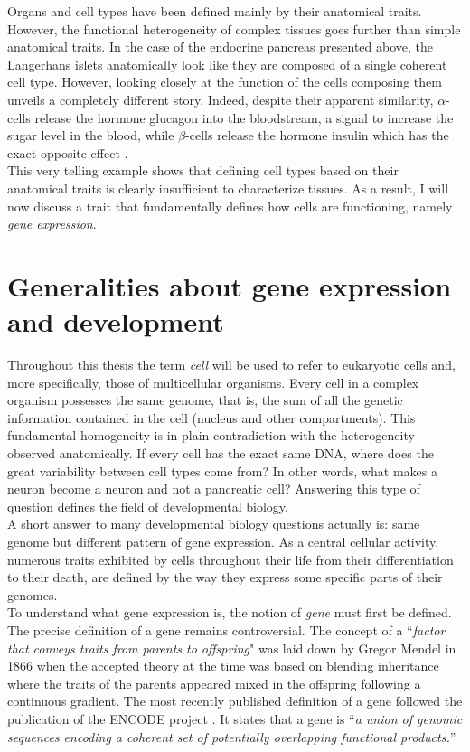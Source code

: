      
    Organs and cell types have been defined mainly by their anatomical traits. However, the functional heterogeneity of complex tissues goes further than simple anatomical traits. In the case of the endocrine pancreas presented above, the Langerhans islets anatomically look like they are composed of a single coherent cell type. However, looking closely at the function of the cells composing them unveils a completely different story. Indeed, despite their apparent similarity, $\alpha$-cells release the hormone glucagon into the bloodstream, a signal to increase the sugar level in the blood, while $\beta$-cells release the hormone insulin which has the exact opposite effect \cite{costanzo06}.\\
     
     This very telling example shows that defining cell types based on their anatomical traits is clearly insufficient to characterize tissues.  As a result, I will now discuss a trait that fundamentally defines how cells are functioning, namely \emph{gene expression}. 

\section{Generalities about gene expression and development}\label{sec:gene_expression_background}     
       
     Throughout this thesis the term \emph{cell} will be used to refer to eukaryotic cells and, more specifically, those of multicellular organisms. Every cell in a complex organism possesses the same genome, that is, the sum of all the genetic information contained in the cell (nucleus and other compartments). This fundamental homogeneity is in plain contradiction with the heterogeneity observed anatomically. If every cell has the exact same DNA, where does the great variability between cell types come from? In other words, what makes a neuron become a neuron and not a pancreatic cell? Answering this type of question defines the field of developmental biology.\\
     
     A short answer to many developmental biology questions actually is: same genome but different pattern of gene expression. As a central cellular activity, numerous traits exhibited by cells throughout their life from their differentiation to their death, are defined by the way they express some specific parts of their genomes.\\

     To understand what gene expression is, the notion of \emph{gene} must first be defined. The precise definition of a gene remains controversial. The concept of a ``\emph{factor that conveys traits from parents to offspring}" was laid down by Gregor Mendel in 1866 \cite{mendel66} when the accepted theory at the time was based on blending inheritance where the traits of the parents appeared mixed in the offspring following a continuous gradient. The most recently published definition of a gene followed the publication of the ENCODE project \cite{feingold04}. It states that a gene is ``\emph{a union of genomic sequences encoding a coherent set of potentially overlapping functional products.}''\\

